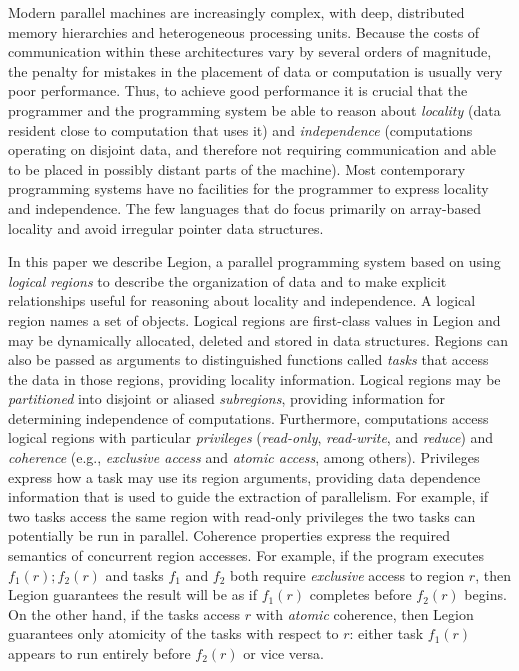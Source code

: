 \documentclass[conference]{IEEEtran}
\begin{document}
Modern parallel machines are increasingly complex, with deep,
distributed memory hierarchies and heterogeneous processing units.  Because the
costs of communication within these architectures vary by several orders of magnitude, 
the penalty for mistakes in the placement of data or computation is usually very poor performance.  Thus,
to achieve good performance it is crucial that the programmer
and the programming system be able to reason about {\em locality} (data resident
close to computation that uses it) and {\em independence} (computations
operating on disjoint data, and therefore not requiring communication and able to be placed in possibly distant parts of the machine).  
Most contemporary
programming systems have no facilities for the programmer to express locality
and independence.  The few languages that do focus primarily on
array-based locality \cite{Fatahalian06,CHAPEL04,UPC99} and 
avoid irregular pointer data structures.  
%
%

In this paper we describe Legion, a parallel programming system based
on using {\em logical regions} to describe the organization of data
and to make explicit relationships useful for reasoning about locality
and independence.
A logical region names a set of objects.  Logical regions are first-class 
values in Legion and may be dynamically allocated, deleted and stored
in data structures. Regions can also be passed as arguments
to distinguished functions called {\em tasks} that access the data in
those regions, providing locality information.  Logical regions may be
{\em partitioned} into disjoint or aliased {\em subregions}, providing
information for determining independence of computations.
Furthermore, computations access logical regions with particular {\em
  privileges} ({\em read-only}, {\em read-write}, and {\em reduce}) and {\em coherence} (e.g., {\em exclusive access} and {\em
  atomic access}, among others).  Privileges express how a task may use
its region arguments, providing data dependence information that
is used to guide the extraction of parallelism.  For example, if two tasks
access the same region with read-only privileges the two tasks
can potentially be run in parallel.
Coherence properties express the required semantics of concurrent region accesses.
For example, if the program executes $f_1(r); f_2(r)$ and tasks $f_1$
and $f_2$ both require {\em exclusive} access to region $r$, then Legion guarantees the result will
be as if $f_1(r)$ completes before $f_2(r)$ begins.   On the other hand, if
the tasks access $r$ with {\em atomic} coherence, then Legion
guarantees only atomicity of the tasks with respect to $r$: either task $f_1(r)$
appears to run entirely before $f_2(r)$ or vice versa.
\end{document}
